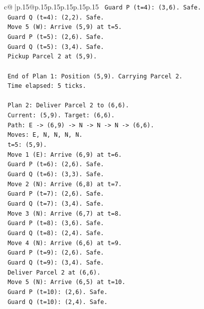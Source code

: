 \documentclass{article}
\begin{document}
{\begin{supertabular}{c@{$\;$}|p{.15\linewidth}@{}p{.15\linewidth}p{.15\linewidth}p{.15\linewidth}p{.15\linewidth}p{.15\linewidth}}
{{{\texttt{         Guard P (t=4): (3,6). Safe.} \\
\texttt{         Guard Q (t=4): (2,2). Safe.} \\
\texttt{      Move 5 (W): Arrive (5,9) at t=5.} \\
\texttt{         Guard P (t=5): (2,6). Safe.} \\
\texttt{         Guard Q (t=5): (3,4). Safe.} \\
\texttt{         Pickup Parcel 2 at (5,9).} \\
\\ 
\texttt{      End of Plan 1: Position (5,9). Carrying Parcel 2.} \\
\texttt{      Time elapsed: 5 ticks.} \\
\\ 
\texttt{      Plan 2: Deliver Parcel 2 to (6,6).} \\
\texttt{      Current: (5,9). Target: (6,6).} \\
\texttt{      Path: E {-}> (6,9) {-}> N {-}> N {-}> N {-}> (6,6).} \\
\texttt{      Moves: E, N, N, N, N.} \\
\texttt{      t=5: (5,9).} \\
\texttt{      Move 1 (E): Arrive (6,9) at t=6.} \\
\texttt{         Guard P (t=6): (2,6). Safe.} \\
\texttt{         Guard Q (t=6): (3,3). Safe.} \\
\texttt{      Move 2 (N): Arrive (6,8) at t=7.} \\
\texttt{         Guard P (t=7): (2,6). Safe.} \\
\texttt{         Guard Q (t=7): (3,4). Safe.} \\
\texttt{      Move 3 (N): Arrive (6,7) at t=8.} \\
\texttt{         Guard P (t=8): (3,6). Safe.} \\
\texttt{         Guard Q (t=8): (2,4). Safe.} \\
\texttt{      Move 4 (N): Arrive (6,6) at t=9.} \\
\texttt{         Guard P (t=9): (2,6). Safe.} \\
\texttt{         Guard Q (t=9): (3,4). Safe.} \\
\texttt{         Deliver Parcel 2 at (6,6).} \\
\texttt{      Move 5 (N): Arrive (6,5) at t=10.} \\
\texttt{         Guard P (t=10): (2,6). Safe.} \\
\texttt{         Guard Q (t=10): (2,4). Safe.} \\
}}}
\end{supertabular}}
\end{document}
